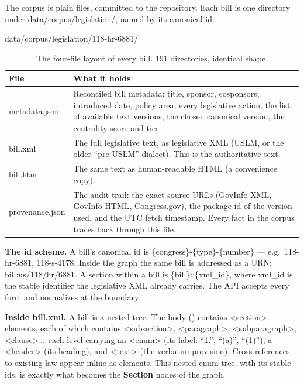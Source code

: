 \documentclass[11pt]{article}
\newcommand{\code}[1]{{\ttfamily\small #1}}
\newcommand{\nodet}[2]{{\color{#1}\sffamily\bfseries #2}}
\begin{document}
The corpus is plain files, committed to the repository. Each bill is one
directory under \code{data/corpus/legislation/}, named by its canonical id:

\begin{center}\small
\code{data/corpus/legislation/118-hr-6881/}
\end{center}

\begin{table}[ht]
\centering\small
\begin{tabular}{@{}lp{10.4cm}@{}}
\toprule
\textbf{File} & \textbf{What it holds}\\
\midrule
\code{metadata.json}   & Reconciled bill metadata: title, sponsor, cosponsors,
  introduced date, policy area, every legislative action, the list of available
  text versions, the chosen canonical version, the centrality score and tier.\\
\code{bill.xml}        & The full legislative text, as legislative XML (USLM, or
  the older ``pre-USLM'' dialect). This is the authoritative text.\\
\code{bill.htm}        & The same text as human-readable HTML (a convenience copy).\\
\code{provenance.json} & The audit trail: the exact source URLs (GovInfo XML,
  GovInfo HTML, Congress.gov), the package id of the version used, and the UTC
  fetch timestamp. Every fact in the corpus traces back through this file.\\
\bottomrule
\end{tabular}
\caption{The four-file layout of every bill. 191 directories, identical shape.}
\end{table}

\textbf{The id scheme.} A bill's canonical id is
\code{\{congress\}-\{type\}-\{number\}} --- e.g.\ \code{118-hr-6881},
\code{118-s-4178}. Inside the graph the same bill is addressed as a URN:
\code{bill:us/118/hr/6881}. A section within a bill is
\code{\{bill\}::\{xml\_id\}}, where \code{xml\_id} is the stable identifier the
legislative XML already carries. The API accepts every form and normalizes at
the boundary.

\textbf{Inside \code{bill.xml}.} A bill is a nested tree. The body
(\code{<legis-body>}) contains \code{<section>} elements, each of which contains
\code{<subsection>}, \code{<paragraph>}, \code{<subparagraph>},
\code{<clause>}\ldots\ each level carrying an \code{<enum>} (its label: ``1.'',
``(a)'', ``(1)''), a \code{<header>} (its heading), and \code{<text>} (the
verbatim provision). Cross-references to existing law appear inline as
\code{<external-xref>} elements. This nested-enum tree, with its stable ids, is
exactly what becomes the \nodet{cSec}{Section} nodes of the graph.
\end{document}
